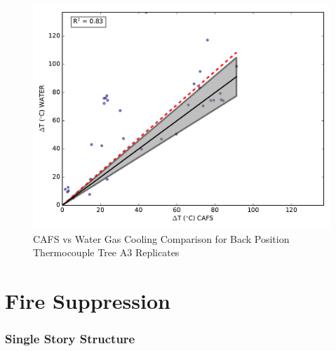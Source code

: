 \documentclass[12pt,oneside]{book}
\begin{document}
\begin{figure}[!ht]
	\includegraphics[width=.7\columnwidth]{../Figures/Gas_Cooling/Combined_fullback_A3_scatter}
	\caption{CAFS vs Water Gas Cooling Comparison for Back Position Thermocouple Tree A3 Replicates}
	\label{fig:CAFS_Water_A3_back}
\end{figure}


\clearpage

\section{Fire Suppression}
\label{sec:Fire_Suppression}

\subsubsection*{Single Story Structure}
\label{sec:fire_supp_single}
\end{document}
